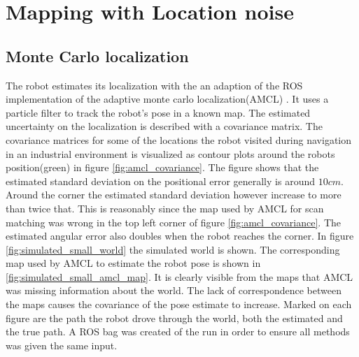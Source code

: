 \section{Mapping with Location noise}

\subsection{Monte Carlo localization}
The robot estimates its localization with the an adaption of the ROS implementation \cite{ros_amcl} of the adaptive monte carlo localization(AMCL) \cite{Thrun200199}. It uses a particle filter to track the robot's pose in a known map. 
The estimated uncertainty on the localization is described with a covariance matrix. The covariance matrices for some of the locations the robot visited during navigation in an industrial environment is visualized as contour plots around the robots position(green) in figure \ref{fig:amcl_covariance}. 
The figure shows that the estimated standard deviation on the positional error generally is around $10cm$. Around the corner the estimated standard deviation however increase to more than twice that. This is reasonably since the map used by AMCL for scan matching was wrong in the top left corner of figure \ref{fig:amcl_covariance}. The estimated angular error also doubles when the robot reaches the corner.
In figure \ref{fig:simulated_small_world} the simulated world is shown. The corresponding map used by AMCL to estimate the robot pose is shown in \ref{fig:simulated_small_amcl_map}.
It is clearly visible from the maps that AMCL was missing information about the world. The lack of correspondence between the maps causes the covariance of the pose estimate to increase.
Marked on each figure are the path the robot drove through the world, both the estimated and the true path.
A ROS bag was created of the run in order to ensure all methods was given the same input. 

